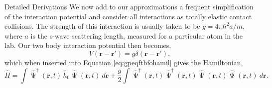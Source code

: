 \begin{chapter}{Detailed Derivations\label{app:App2}}
We now add to our approximations a frequent simplification of the interaction potential and consider all interactions as totally elastic contact collisions. The strength of this interaction is usually taken to be $g=4\pi\hbar^2a/m$, where $a$ is the s-wave scattering length, measured for a particular atom in the lab. Our two body interaction potential then becomes,
\begin{equation*}
V(\mathbf{r}-\mathbf{r}') = g \delta(\mathbf{r}-\mathbf{r}'),
\end{equation*}
which when inserted into Equation \ref{eq:gpeqftbfohamil} gives the Hamiltonian,
\begin{equation*}
\hat{H} = \int \hat{\upPsi}^\dagger(\mathbf{r},t)\,\hat{h}_0 \hat{\upPsi}(\mathbf{r},t)~d\mathbf{r}+\frac{g}{2}\int \hat{\upPsi}^\dagger(\mathbf{r},t)\hat{\upPsi}^\dagger(\mathbf{r},t)\hat{\upPsi}(\mathbf{r},t)\hat{\upPsi}(\mathbf{r},t)~d\mathbf{r}.
\label{eq:gpeqftvgdhamil}
\end{equation*}


\end{chapter}
